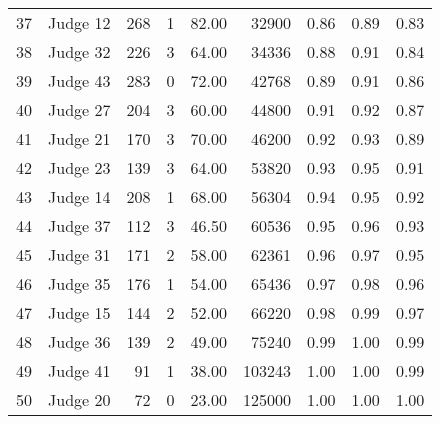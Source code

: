 \begin{tabular}{llrrrrrrr}
37 &  Judge 12 &   268 &      1 &  82.00 &         32900 &       0.86 &        0.89 &        0.83 \\
38 &  Judge 32 &   226 &      3 &  64.00 &         34336 &       0.88 &        0.91 &        0.84 \\
39 &  Judge 43 &   283 &      0 &  72.00 &         42768 &       0.89 &        0.91 &        0.86 \\
40 &  Judge 27 &   204 &      3 &  60.00 &         44800 &       0.91 &        0.92 &        0.87 \\
41 &  Judge 21 &   170 &      3 &  70.00 &         46200 &       0.92 &        0.93 &        0.89 \\
42 &  Judge 23 &   139 &      3 &  64.00 &         53820 &       0.93 &        0.95 &        0.91 \\
43 &  Judge 14 &   208 &      1 &  68.00 &         56304 &       0.94 &        0.95 &        0.92 \\
44 &  Judge 37 &   112 &      3 &  46.50 &         60536 &       0.95 &        0.96 &        0.93 \\
45 &  Judge 31 &   171 &      2 &  58.00 &         62361 &       0.96 &        0.97 &        0.95 \\
46 &  Judge 35 &   176 &      1 &  54.00 &         65436 &       0.97 &        0.98 &        0.96 \\
47 &  Judge 15 &   144 &      2 &  52.00 &         66220 &       0.98 &        0.99 &        0.97 \\
48 &  Judge 36 &   139 &      2 &  49.00 &         75240 &       0.99 &        1.00 &        0.99 \\
49 &  Judge 41 &    91 &      1 &  38.00 &        103243 &       1.00 &        1.00 &        0.99 \\
50 &  Judge 20 &    72 &      0 &  23.00 &        125000 &       1.00 &        1.00 &        1.00 \\
\bottomrule
\end{tabular}
